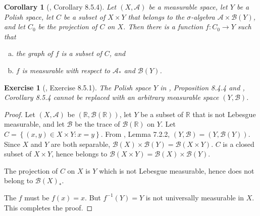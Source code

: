 \documentclass[11pt]{article}
\theoremstyle{plain}
\newtheorem{exercise}{Exercise}
\newtheorem{corollary}{Corollary}
\theoremstyle{definition}
\theoremstyle{remark}
\begin{document}
\begin{corollary}[\cite{book:992991}, Corollary 8.5.4]
    Let $(X, \mathscr A)$ be a measurable space, let $Y$ be a Polish space, let $C$ be a subset of $X \times Y$ that belongs to the $\sigma$-algebra $\mathscr A \times \mathscr B (Y)$, and let $C_0$ be the projection of $C$ on $X$.
    Then there is a function $f: C_0 \to Y$ such that
    \begin{enumerate}[(a)]
        \item 
            the graph of $f$ is a subset of $C$, and
        \item
            $f$ is measurable with respect to $\mathscr A_*$ and $\mathscr B (Y)$.
    \end{enumerate}
\end{corollary}

\begin{exercise}[\cite{book:992991}, Exercise 8.5.1]
    The Polish space $Y$ in \cite{book:992991}, Proposition 8.4.4 and \cite{book:992991}, Corollary 8.5.4 cannot be replaced with an arbitrary measurable space $(Y, \mathscr B)$.
\end{exercise}

\begin{proof}
    Let $(X, \mathscr A)$ be $(\mathbb R, \mathscr B (\mathbb R))$, let $Y$ be a subset of $\mathbb R$ that is not Lebesgue measurable, and let $\mathscr B$ be the trace of $\mathscr B (\mathbb R)$ on $Y$.
    Let $C= \left\{ (x,y) \in X\times Y: x=y \right\}$.
    From \cite{book:992991}, Lemma 7.2.2, $(Y, \mathscr B)= (Y, \mathscr B (Y))$.
    Since $X$ and $Y$ are both separable, $\mathscr B(X) \times \mathscr B (Y) = \mathscr B (X\times Y)$.
    $C$ is a closed subset of $X\times Y$, hence belongs to $\mathscr B (X\times Y)=\mathscr B(X) \times \mathscr B (Y) $.
    
    The projection of $C$ on $X$ is $Y$ which is not Lebesgue measurable, hence does not belong to $\mathscr B (X)_*$.

    The $f$ must be $f(x) = x$. But $f^{-1}(Y) = Y$ is not universally measurable in $X$. 
    This completes the proof.
    
\end{proof}



\end{document}
